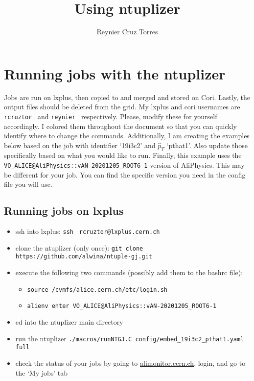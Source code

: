 \documentclass[12pt]{article}
\title{Using ntuplizer}
\author{Reynier Cruz Torres}
\begin{document}
\maketitle

\tableofcontents

\newpage

\section{Running jobs with the ntuplizer}

Jobs are run on lxplus, then copied to and merged and stored on Cori. Lastly, the output files should be deleted from the grid.
My lxplus and cori usernames are \color{olive}\verb|rcruztor|\color{black} \ and \color{olive}\verb|reynier|\color{black} \ respectively. Please, modify these for yourself accordingly. I colored them throughout the document so that you can quickly identify where to change the commands.
Additionally, I am creating the examples below based on the job with identifier `19i3c2' and $\hat p_T$ `pthat1'. Also update those specifically based on what you would like to run.
Finally, this example uses the \verb|VO_ALICE@AliPhysics::vAN-20201205_ROOT6-1| version of AliPhysics. This may be different for your job. You can find the specific version you need in the config file you will use.

\subsection{Running jobs on lxplus}

\begin{itemize}
\item ssh into lxplus: \verb|ssh |\color{olive} \verb|rcruztor|\color{black}\verb|@lxplus.cern.ch|

\color{red}
\item clone the ntuplizer (only once): \verb|git clone https://github.com/alwina/ntuple-gj.git|
\color{black}

\item execute the following two commands (possibly add them to the bashrc file):

\begin{itemize}
\item \verb|source /cvmfs/alice.cern.ch/etc/login.sh|
\item \verb|alienv enter VO_ALICE@AliPhysics::vAN-20201205_ROOT6-1|
\end{itemize}

\item cd into the ntuplizer main directory

\item run the ntuplizer \verb|./macros/runNTGJ.C config/embed_19i3c2_pthat1.yaml full|

\item check the status of your jobs by going to \href{https://alimonitor.cern.ch/}{alimonitor.cern.ch}, login, and go to the `My jobs' tab

\end{itemize}
\end{document}
